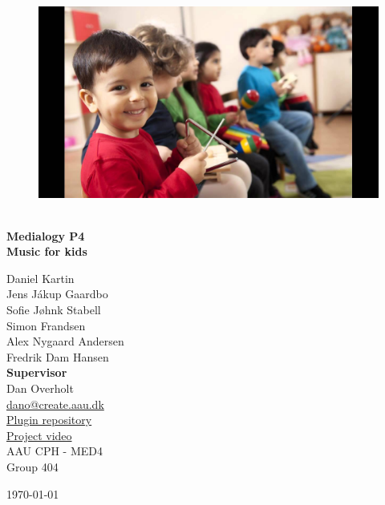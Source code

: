 \begin{titlepage}
			
\addtolength{\voffset}{2cm}

\begin{figure}[H]
\centering
\vspace{2cm}	%
\includegraphics[width=0.99\linewidth]{figure/Frontpage/frontpage}
\end{figure}

\mbox{}
\vfill
\renewcommand{\familydefault}{\sfdefault} \normalfont %
\HRule\\[0.1cm]
\textbf{{\small Medialogy P4\\ {\Huge Music for kids}}} \hspace{0.15cm}\\
\HRule\smallskip{}
\begin{multicols}{2}
{\Large Daniel Kartin\\Jens Jákup Gaardbo\\Sofie Jøhnk Stabell\\Simon Frandsen\\Alex Nygaard Andersen\\Fredrik Dam Hansen\columnbreak}\\
\setlength{\parskip}{2.4cm}
{\Large{\textbf{Supervisor}\\Dan Overholt\\\href{mailto:dano@create.aau.dk}{dano@create.aau.dk}}}\medskip\\
\href{https://github.com/totalfreak/medialogyp4code}{Plugin repository}\\
\href{https:google.com}{Project video}\medskip
\\\small AAU CPH - 
MED4 \\
Group 404\\
\end{multicols}
\today
\renewcommand{\familydefault}{\rmdefault} \normalfont %
\end{titlepage}


